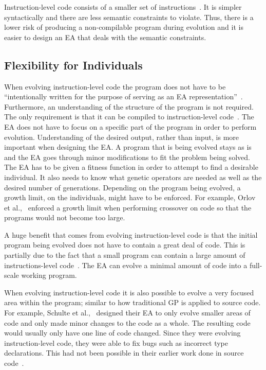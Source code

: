 \documentclass{sig-alternate}
\begin{document}
Instruction-level code consists of a smaller set of instructions~\cite{Assembly:2010}. It is simpler syntactically and there are less semantic constraints to violate. Thus, there is a lower risk of producing a non-compilable program during evolution and it is easier to design an EA that deals with the semantic constraints.

\subsection{Flexibility  for Individuals}

When evolving instruction-level code the program does not have to be ``intentionally written for the purpose of serving as an EA representation''~\cite{FINCH2:2009}. Furthermore, an understanding of the structure of the program is not required. The only requirement is that it can be compiled to instruction-level code~\cite{FINCH2:2009, Assembly:2010}. The EA does not have to focus on a specific part of the program in order to perform evolution. Understanding of the desired output, rather than input, is more important when designing the EA. A program that is being evolved stays as is and the EA goes through minor modifications to fit the problem being solved. The EA has to be given a fitness function in order to attempt to find a desirable individual. It also needs to know what genetic operators are needed as well as the desired number of generations. Depending on the program being evolved, a growth limit, on the individuals, might have to be enforced. For example, Orlov et al.,~\cite{FINCH:2011} enforced a growth limit when performing crossover on code so that the programs would not become too large.

A huge benefit that comes from evolving instruction-level code is that the initial program being evolved does not have to contain a great deal of code. This is partially due to the fact that a small program can contain a large amount of instructions-level code~\cite{Assembly:2010}. The EA can evolve a minimal amount of code into a full-scale working program.\par 

When evolving instruction-level code it is also possible to evolve a very focused area within the program; similar to how traditional GP is applied to source code. For example, Schulte et al.,~\cite{Assembly:2010} designed their EA to only evolve smaller areas of code and only made minor changes to the code as a whole. The resulting code would usually only have one line of code changed. Since they were evolving instruction-level code, they were able to fix bugs such as incorrect type declarations. This had not been possible in their earlier work done in source code~\cite{Forrest:2009}. 
\end{document}
